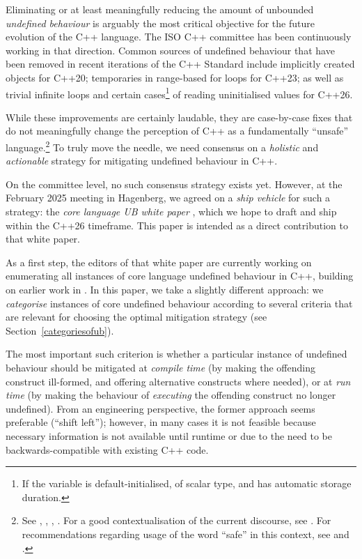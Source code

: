Eliminating or at least meaningfully reducing the amount of unbounded \emph{undefined behaviour} is arguably the most critical objective for the future evolution of the C++ language. The ISO C++ committee has been continuously working in that direction. Common sources of undefined behaviour that have been removed in recent iterations of the C++ Standard include implicitly created objects \cite{P0593R6} for C++20; temporaries in range-based for loops \cite{P2012R2} for C++23; as well as trivial infinite loops \cite{P2809R3} and certain cases\footnote{If the variable is default-initialised, of scalar type, and has automatic storage duration.} of reading uninitialised values \cite{P2795R5} for C++26.

While these improvements are certainly laudable, they are case-by-case fixes that do not meaningfully change the perception of C++ as a fundamentally ``unsafe'' language.\footnote{See \cite{NSA2022}, \cite{CR2023}, \cite{CISA2023}, \cite{ONCD2024}. For a good contextualisation of the current discourse, see \cite{Sutter2024}. For recommendations regarding usage of the word ``safe'' in this context, see \cite{P3500R1} and \cite{P3578R0}.} To truly move the needle, we need consensus on a \emph{holistic} and \emph{actionable} strategy for mitigating undefined behaviour in C++.

On the committee level, no such consensus strategy exists yet. However, at the February 2025 meeting in Hagenberg, we agreed on a \emph{ship vehicle} for such a strategy: the \emph{core language UB white paper} \cite{P3656R0}, which we hope to draft and ship within the C++26 timeframe. This paper is intended as a direct contribution to that white paper.

As a first step, the editors of that white paper are currently working on enumerating all instances of core language undefined behaviour in C++, building on earlier work in \cite{P1705R1}. In this paper, we take a slightly different approach: we \emph{categorise} instances of core undefined behaviour according to several criteria that are relevant for choosing the optimal mitigation strategy (see Section~\ref{categoriesofub}).

The most important such criterion is whether a particular instance of undefined behaviour should be mitigated at \emph{compile time} (by making the offending construct ill-formed, and offering alternative constructs where needed), or at \emph{run time} (by making the behaviour of \emph{executing} the offending construct no longer undefined). From an engineering perspective, the former approach seems preferable (``shift left''); however, in many cases it is not feasible because necessary information is not available until runtime or due to the need to be backwards-compatible with existing C++ code.

